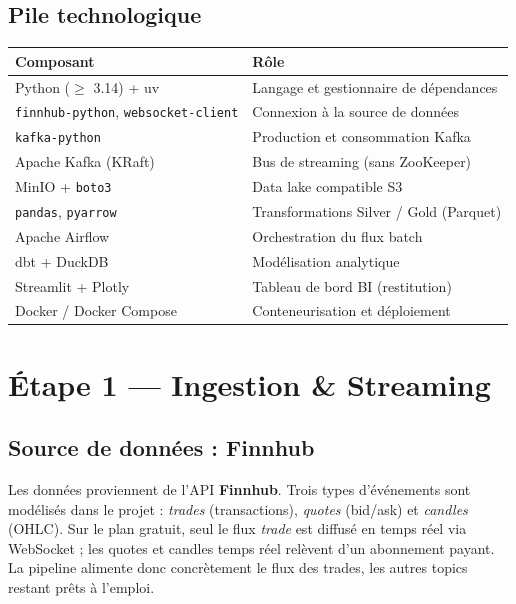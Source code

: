 \documentclass[11pt,a4paper]{article}
\newcommand{\code}[1]{\texttt{\small #1}}
\begin{document}
\subsection{Pile technologique}

\begin{center}
\renewcommand{\arraystretch}{1.25}
\begin{tabularx}{\linewidth}{@{}lX@{}}
\toprule
\textbf{Composant} & \textbf{Rôle} \\
\midrule
Python ($\geq$ 3.14) + uv & Langage et gestionnaire de dépendances \\
\code{finnhub-python}, \code{websocket-client} & Connexion à la source de données \\
\code{kafka-python} & Production et consommation Kafka \\
Apache Kafka (KRaft) & Bus de streaming (sans ZooKeeper) \\
MinIO + \code{boto3} & Data lake compatible S3 \\
\code{pandas}, \code{pyarrow} & Transformations Silver / Gold (Parquet) \\
Apache Airflow & Orchestration du flux batch \\
dbt + DuckDB & Modélisation analytique \\
Streamlit + Plotly & Tableau de bord BI (restitution) \\
Docker / Docker Compose & Conteneurisation et déploiement \\
\bottomrule
\end{tabularx}
\end{center}

\section{Étape 1 — Ingestion \& Streaming}

\subsection{Source de données : Finnhub}

Les données proviennent de l'API \textbf{Finnhub}. Trois types d'événements
sont modélisés dans le projet : \emph{trades} (transactions), \emph{quotes}
(bid/ask) et \emph{candles} (OHLC). Sur le plan gratuit, seul le flux
\emph{trade} est diffusé en temps réel via WebSocket ; les quotes et candles
temps réel relèvent d'un abonnement payant. La pipeline alimente donc
concrètement le flux des trades, les autres topics restant prêts à l'emploi.
\end{document}
